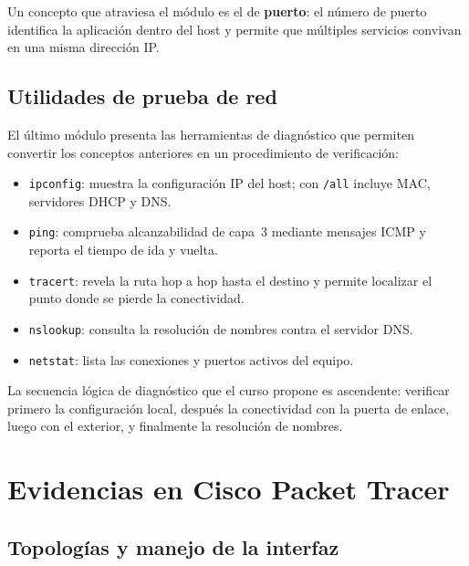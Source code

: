 \documentclass[11pt,a4paper]{article}
\newcommand{\pendiente}[1]{\textcolor{red}{\textbf{[PENDIENTE: #1]}}}
\begin{document}
Un concepto que atraviesa el módulo es el de \textbf{puerto}: el número de
puerto identifica la aplicación dentro del host y permite que múltiples
servicios convivan en una misma dirección IP.

\subsection{Utilidades de prueba de red}

El último módulo presenta las herramientas de diagnóstico que permiten
convertir los conceptos anteriores en un procedimiento de verificación:

\begin{itemize}[leftmargin=*]
  \item \texttt{ipconfig}: muestra la configuración IP del host; con
        \texttt{/all} incluye MAC, servidores DHCP y DNS.
  \item \texttt{ping}: comprueba alcanzabilidad de capa~3 mediante mensajes
        ICMP y reporta el tiempo de ida y vuelta.
  \item \texttt{tracert}: revela la ruta hop a hop hasta el destino y permite
        localizar el punto donde se pierde la conectividad.
  \item \texttt{nslookup}: consulta la resolución de nombres contra el
        servidor DNS.
  \item \texttt{netstat}: lista las conexiones y puertos activos del equipo.
\end{itemize}

La secuencia lógica de diagnóstico que el curso propone es ascendente:
verificar primero la configuración local, después la conectividad con la
puerta de enlace, luego con el exterior, y finalmente la resolución de nombres.

\section{Evidencias en Cisco Packet Tracer}

\subsection{Topologías y manejo de la interfaz}

\end{document}
